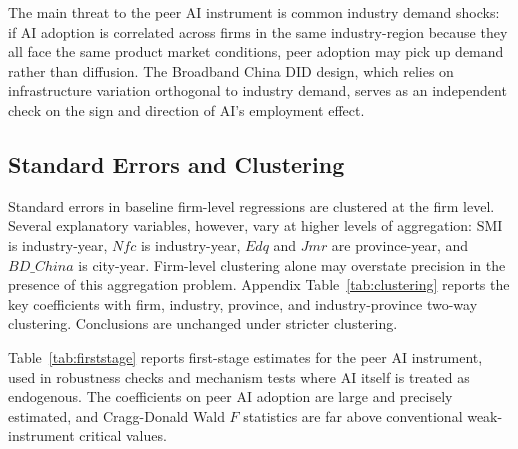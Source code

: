 \documentclass[12pt,a4paper]{article}
\theoremstyle{predstyle}
\theoremstyle{plain}
\newcommand{\SMI}{\mathrm{SMI}}
\newcommand{\Jmr}{\mathit{Jmr}}
\newcommand{\Edq}{\mathit{Edq}}
\newcommand{\Nfc}{\mathit{Nfc}}
\begin{document}
The main threat to the peer AI instrument is common industry demand shocks: if AI adoption is correlated across firms in the same industry-region because they all face the same product market conditions, peer adoption may pick up demand rather than diffusion. The Broadband China DID design, which relies on infrastructure variation orthogonal to industry demand, serves as an independent check on the sign and direction of AI's employment effect.

\subsection{Standard Errors and Clustering}

Standard errors in baseline firm-level regressions are clustered at the firm level. Several explanatory variables, however, vary at higher levels of aggregation: \(\SMI\) is industry-year, \(\Nfc\) is industry-year, \(\Edq\) and \(\Jmr\) are province-year, and \(BD\_China\) is city-year. Firm-level clustering alone may overstate precision in the presence of this \citet{moulton1990illusion} aggregation problem. Appendix Table~\ref{tab:clustering} reports the key coefficients with firm, industry, province, and industry-province two-way clustering. Conclusions are unchanged under stricter clustering.

\bigskip
Table~\ref{tab:firststage} reports first-stage estimates for the peer AI instrument, used in robustness checks and mechanism tests where AI itself is treated as endogenous. The coefficients on peer AI adoption are large and precisely estimated, and Cragg-Donald Wald \(F\) statistics are far above conventional weak-instrument critical values.
\end{document}

